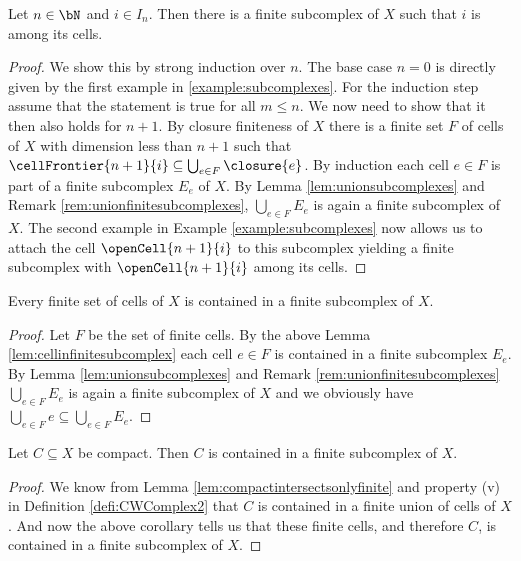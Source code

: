 \begin{lem} \label{lem:cellinfinitesubcomplex}
    Let $n \in \bN$ and $i \in I_n$. 
    Then there is a finite subcomplex of $X$ such that $i$ is among its cells. 
    \href{https://github.com/scholzhannah/CWComplexes/blob/7be4872a05b534011cc969eb5b80a4b7f0bf57e2/CWcomplexes/subcomplex.lean#L336-L364}{\faExternalLink}
\end{lem}
\begin{proof}
    We show this by strong induction over $n$. 
    The base case $n = 0$ is directly given by the first example in \ref{example:subcomplexes}. 
    For the induction step assume that the statement is true for all $m \le n$.
    We now need to show that it then also holds for $n + 1$. 
    By closure finiteness of $X$ there is a finite set $F$ of cells of $X$ with dimension less than $n + 1$ such that $\cellFrontier{n  + 1}{i} \subseteq \bigcup_{e \in F} \closure{e}$. 
    By induction each cell $e \in F$ is part of a finite subcomplex $E_e$ of $X$. 
    By Lemma \ref{lem:unionsubcomplexes} and Remark \ref{rem:unionfinitesubcomplexes}, $\bigcup_{e \in F}E_e$ is again a finite subcomplex of $X$. 
    The second example in Example \ref{example:subcomplexes} now allows us to attach the cell $\openCell{n + 1}{i}$ to this subcomplex yielding a finite subcomplex with $\openCell{n + 1}{i}$ among its cells.
\end{proof}

\begin{cor}
    Every finite set of cells of $X$ is contained in a finite subcomplex of $X$. \href{https://github.com/scholzhannah/CWComplexes/blob/7be4872a05b534011cc969eb5b80a4b7f0bf57e2/CWcomplexes/subcomplex.lean#L374-L384}{\faExternalLink}
\end{cor}
\begin{proof}
    Let $F$ be the set of finite cells. 
    By the above Lemma \ref{lem:cellinfinitesubcomplex} each cell $e \in F$ is contained in a finite subcomplex $E_e$. 
    By Lemma \ref{lem:unionsubcomplexes} and Remark \ref{rem:unionfinitesubcomplexes} $\bigcup_{e \in F}E_e$ is again a finite subcomplex of $X$ and we obviously have $\bigcup_{e \in F} e \subseteq \bigcup_{e \in F}E_e$.
\end{proof}

\begin{cor} \label{cor:compactinfinitesubcomplex}
    Let $C \subseteq X$ be compact. 
    Then $C$ is contained in a finite subcomplex of $X$. 
    \href{https://github.com/scholzhannah/CWComplexes/blob/7be4872a05b534011cc969eb5b80a4b7f0bf57e2/CWcomplexes/subcomplex.lean#L386-L397}{\faExternalLink}
\end{cor}
\begin{proof}
    We know from Lemma \ref{lem:compactintersectsonlyfinite} and property (v) in Definition \ref{defi:CWComplex2} that $C$ is contained in a finite union of cells of $X$. 
    And now the above corollary tells us that these finite cells, and therefore $C$, is contained in a finite subcomplex of $X$.
\end{proof}